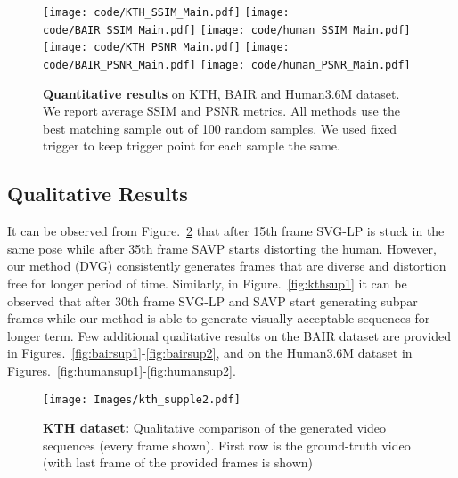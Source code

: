 \documentclass{article} \usepackage{iclr2021_conference,times}
\begin{document}
 \begin{figure}[!h]
    \centering
\texttt{[image: code/KTH\_SSIM\_Main.pdf]}
    \texttt{[image: code/BAIR\_SSIM\_Main.pdf]}
    \texttt{[image: code/human\_SSIM\_Main.pdf]}\\
    \texttt{[image: code/KTH\_PSNR\_Main.pdf]}
    \texttt{[image: code/BAIR\_PSNR\_Main.pdf]}
    \texttt{[image: code/human\_PSNR\_Main.pdf]}
\caption{\textbf{Quantitative results} on KTH, BAIR and Human3.6M dataset. We report average SSIM and PSNR metrics. All methods use the best matching sample out of 100 random samples. We used fixed trigger to keep trigger point for each sample the same.}
    \label{fig:psnr_ssim}
\end{figure}




\subsection{Qualitative Results}
It can be observed from Figure.~\ref{fig:kthsup2} that after 15th frame SVG-LP is stuck in the same pose while after 35th frame SAVP starts distorting the human. However, our method (DVG) consistently generates frames that are diverse and distortion free for longer period of time. Similarly, in Figure.~\ref{fig:kthsup1} it can be observed that after 30th frame SVG-LP and SAVP start generating subpar frames while our method is able to generate visually acceptable sequences for longer term. Few additional qualitative results on the BAIR dataset are provided in Figures.~\ref{fig:bairsup1}-\ref{fig:bairsup2}, and on the Human3.6M dataset in Figures.~\ref{fig:humansup1}-\ref{fig:humansup2}.

\begin{figure}[t]
    \centering
    \texttt{[image: Images/kth\_supple2.pdf]}
    \caption{\textbf{KTH dataset:} Qualitative comparison of the generated video sequences (every  frame shown). First row is the ground-truth video (with last frame of the provided  frames is shown)}
    \label{fig:kthsup2}
\end{figure}
\end{document}

